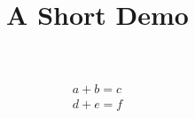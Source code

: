 \documentclass[article]{jss}
\title{A Short Demo}
\begin{document}
\begin{gather}
a + b = c \\
d + e = f
\end{gather}
\end{document}
